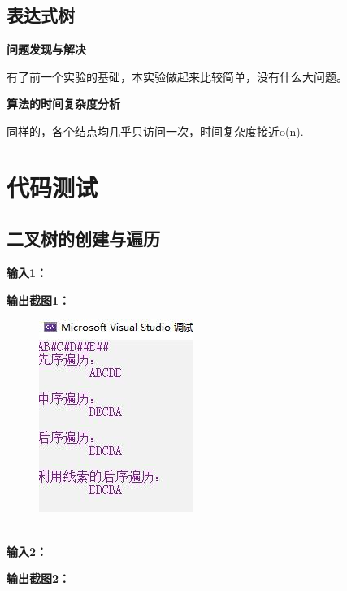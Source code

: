 \documentclass[UTF8]{article}
\newcommand{\jumpLine} {\hspace*{\fill} \\}
\begin{document}
	\subsection{表达式树}
	\textbf{问题发现与解决}\par
	有了前一个实验的基础，本实验做起来比较简单，没有什么大问题。\par
	\textbf{算法的时间复杂度分析}\par
	同样的，各个结点均几乎只访问一次，时间复杂度接近o(n).\par
	
	
	\section{代码测试}
	\subsection{二叉树的创建与遍历}
	\textbf{输入1：}\par
	\par
	\textbf{输出截图1：}\par
	\begin{figure}[H]
		\centering
		\includegraphics[width=0.5\linewidth]{test1_1.jpg}
		\label{test1_1}
	\end{figure}\par
	\jumpLine
	\textbf{输入2：}\par
	\par
	\textbf{输出截图2：}\par
\end{document}
